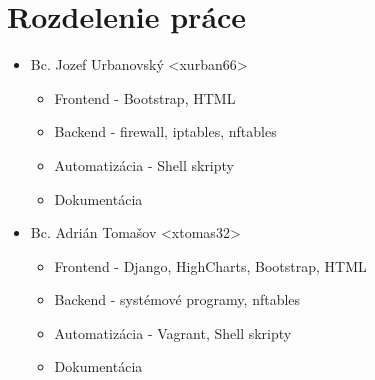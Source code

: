 	\section{Rozdelenie práce}
	
	\begin{itemize}
		\item Bc. Jozef Urbanovský <xurban66>
		\begin{itemize}
			\item Frontend - Bootstrap, HTML
			\item Backend - firewall, iptables, nftables
			\item Automatizácia - Shell skripty
			\item Dokumentácia
		\end{itemize}
	
		\item Bc. Adrián Tomašov <xtomas32>
		\begin{itemize}
			\item Frontend - Django, HighCharts, Bootstrap, HTML
			\item Backend - systémové programy, nftables
			\item Automatizácia - Vagrant, Shell skripty
			\item Dokumentácia
		\end{itemize}
		
	\end{itemize}
	

